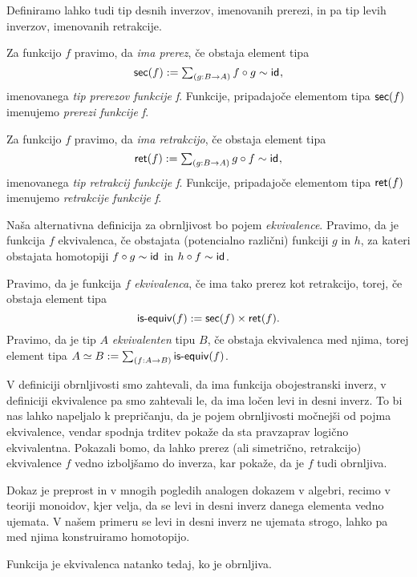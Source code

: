 Definiramo lahko tudi tip desnih inverzov, imenovanih prerezi, in pa tip levih inverzov, imenovanih retrakcije.
\begin{definicija}
  Za funkcijo \(f\) pravimo, da \emph{ima prerez}, če obstaja element tipa
  \[\textnormal{\textsf{sec}}(f) := \textstyle \sum_{\left( g : B \to A \right)} f \circ g \sim \textnormal{\textsf{id}}_{},\]
  imenovanega \emph{tip prerezov funkcije f}.
  Funkcije, pripadajoče elementom tipa \(\textnormal{\textsf{sec}}(f)\) imenujemo \emph{prerezi funkcije f}.

  Za funkcijo \(f\) pravimo, da \emph{ima retrakcijo}, če obstaja element tipa
  \[\textnormal{\textsf{ret}}(f) := \textstyle \sum_{\left( g : B \to A \right)} g \circ f \sim \textnormal{\textsf{id}}_{},\]
  imenovanega \emph{tip retrakcij funkcije f}.
  Funkcije, pripadajoče elementom tipa \(\textnormal{\textsf{ret}}(f)\) imenujemo \emph{retrakcije funkcije f}.
\end{definicija}

Naša alternativna definicija za obrnljivost bo pojem \emph{ekvivalence}. Pravimo, da je funkcija \(f\) ekvivalenca, če obstajata (potencialno različni) funkciji \(g\) in \(h\), za kateri obstajata homotopiji \(f \circ g \sim \textnormal{\textsf{id}}_{}\) in \(h \circ f \sim \textnormal{\textsf{id}}_{}\).

\begin{definicija}
  Pravimo, da je funkcija \(f\) \emph{ekvivalenca}, če ima tako prerez kot retrakcijo,
  torej, če obstaja element tipa \[\textnormal{\textsf{is-equiv}}(f) := \textnormal{\textsf{sec}}(f) \times \textnormal{\textsf{ret}}(f).\]
  Pravimo, da je tip \(A\) \emph{ekvivalenten} tipu \(B\), če obstaja ekvivalenca med
  njima, torej element tipa \(A \simeq B := \textstyle \sum_{\left( f : A \to B \right)} \textnormal{\textsf{is-equiv}}(f)\).
\end{definicija}

V definiciji obrnljivosti smo zahtevali, da ima funkcija obojestranski inverz, v
definiciji ekvivalence pa smo zahtevali le, da ima ločen levi in desni inverz.
To bi nas lahko
napeljalo k prepričanju, da je pojem obrnljivosti močnejši od pojma ekvivalence, vendar
spodnja trditev pokaže da sta pravzaprav logično ekvivalentna. Pokazali bomo, da lahko
prerez (ali simetrično, retrakcijo) ekvivalence \(f\) vedno izboljšamo do inverza,
kar pokaže, da je \(f\) tudi obrnljiva.

Dokaz je preprost in v mnogih pogledih analogen dokazem v algebri, recimo v teoriji monoidov, kjer velja, da se levi in desni inverz danega elementa vedno ujemata. V našem primeru se levi in desni inverz ne ujemata strogo, lahko pa med njima konstruiramo homotopijo.
\begin{trditev}
  \label{inv-of-equiv}
  Funkcija je ekvivalenca natanko tedaj, ko je obrnljiva.
\end{trditev}

